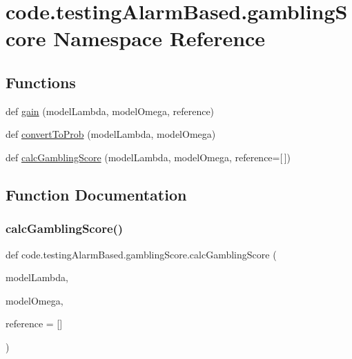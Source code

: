 \hypertarget{namespacecode_1_1testing_alarm_based_1_1gambling_score}{}\section{code.\+testing\+Alarm\+Based.\+gambling\+Score Namespace Reference}
\label{namespacecode_1_1testing_alarm_based_1_1gambling_score}
\subsection*{Functions}
\begin{DoxyCompactItemize}
\item 
def \hyperlink{namespacecode_1_1testing_alarm_based_1_1gambling_score_a1b976a411bf64f4dd4e11bda62fdb183}{gain} (model\+Lambda, model\+Omega, reference)
\item 
def \hyperlink{namespacecode_1_1testing_alarm_based_1_1gambling_score_ae086faa2b17afdc98db596679f232d20}{convert\+To\+Prob} (model\+Lambda, model\+Omega)
\item 
def \hyperlink{namespacecode_1_1testing_alarm_based_1_1gambling_score_aad9bec9d645e25d32c79a3507c32d881}{calc\+Gambling\+Score} (model\+Lambda, model\+Omega, reference=\mbox{[}$\,$\mbox{]})
\end{DoxyCompactItemize}


\subsection{Function Documentation}
\mbox{\label{namespacecode_1_1testing_alarm_based_1_1gambling_score_aad9bec9d645e25d32c79a3507c32d881}} 
\subsubsection{\texorpdfstring{calc\+Gambling\+Score()}{calcGamblingScore()}}
{\footnotesize\ttfamily def code.\+testing\+Alarm\+Based.\+gambling\+Score.\+calc\+Gambling\+Score (\begin{DoxyParamCaption}\item[{}]{model\+Lambda,  }\item[{}]{model\+Omega,  }\item[{}]{reference = {\ttfamily \mbox{[}\mbox{]}} }\end{DoxyParamCaption})}

